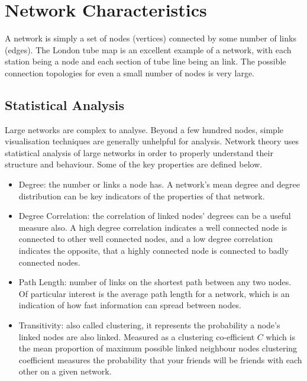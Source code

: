 \section{Network Characteristics}

A network is simply a set of nodes (vertices) connected by some number of links
(edges). The London tube map is an excellent example of a network, with each
station being a node and each section of tube line being an link. The possible
connection topologies for even a small number of nodes is very large.

\subsection{Statistical Analysis}

Large networks are complex to analyse. Beyond a few hundred nodes, simple
visualisation techniques are generally unhelpful for analysis. Network theory
uses statistical analysis of large networks in order to properly understand
their structure and behaviour. Some of the key properties are defined below.

\begin{itemize}
  
  \item Degree: the number or links a node has. A network's mean degree and
    degree distribution can be key indicators of the properties of that
    network. 
    
  \item Degree Correlation: the correlation of linked nodes' degrees can be a
    useful measure also. A high degree correlation indicates a well connected
    node is connected to other well connected nodes, and a low degree
    correlation indicates the opposite, that a highly connected node is
    connected to badly connected nodes.

  \item Path Length: number of links on the shortest path between any two
    nodes. Of particular interest is the average path length for a network,
    which is an indication of how fast information can spread between nodes.
  
  \item Transitivity: also called clustering, it represents the probability a
    node's linked nodes are also linked. Measured as a clustering co-efficient
    $C$ which is the mean proportion of maximum possible linked neighbour nodes
    clustering coefficient measures the probability that your friends will be
    friends with each other on a given network.

\end{itemize}



